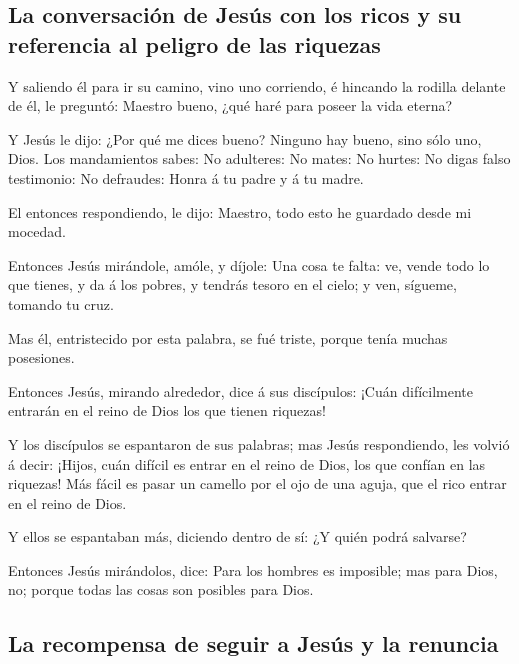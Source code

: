 \hypertarget{la-conversaciuxf3n-de-jesuxfas-con-los-ricos-y-su-referencia-al-peligro-de-las-riquezas}{%
\subsection{La conversación de Jesús con los ricos y su referencia al
peligro de las
riquezas}\label{la-conversaciuxf3n-de-jesuxfas-con-los-ricos-y-su-referencia-al-peligro-de-las-riquezas}}

 Y saliendo él para ir su camino, vino uno corriendo, é
hincando la rodilla delante de él, le preguntó: Maestro bueno, ¿qué haré
para poseer la vida eterna?

 Y Jesús le dijo: ¿Por qué me dices bueno? Ninguno hay
bueno, sino sólo uno, Dios.  Los mandamientos sabes: No
adulteres: No mates: No hurtes: No digas falso testimonio: No defraudes:
Honra á tu padre y á tu madre.

 El entonces respondiendo, le dijo: Maestro, todo esto he
guardado desde mi mocedad.

 Entonces Jesús mirándole, amóle, y díjole: Una cosa te
falta: ve, vende todo lo que tienes, y da á los pobres, y tendrás tesoro
en el cielo; y ven, sígueme, tomando tu cruz.

 Mas él, entristecido por esta palabra, se fué triste,
porque tenía muchas posesiones.

 Entonces Jesús, mirando alrededor, dice á sus
discípulos: ¡Cuán difícilmente entrarán en el reino de Dios los que
tienen riquezas!

 Y los discípulos se espantaron de sus palabras; mas
Jesús respondiendo, les volvió á decir: ¡Hijos, cuán difícil es entrar
en el reino de Dios, los que confían en las riquezas! 
Más fácil es pasar un camello por el ojo de una aguja, que el rico
entrar en el reino de Dios.

 Y ellos se espantaban más, diciendo dentro de sí: ¿Y
quién podrá salvarse?

 Entonces Jesús mirándolos, dice: Para los hombres es
imposible; mas para Dios, no; porque todas las cosas son posibles para
Dios.

\hypertarget{la-recompensa-de-seguir-a-jesuxfas-y-la-renuncia}{%
\subsection{La recompensa de seguir a Jesús y la
renuncia}\label{la-recompensa-de-seguir-a-jesuxfas-y-la-renuncia}}

